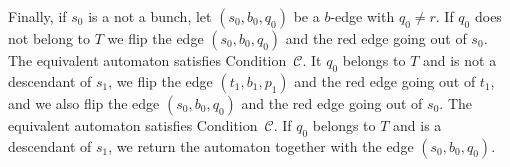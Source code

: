 \documentclass[11pt,a4paper]{article}
\def\C{\mathscr{C}}
\def\T{{T}}
\begin{document}
\begin{itemize}
\begin{itemize}
\begin{itemize}
\begin{itemize}
Finally, if $s_0$ is a not a bunch, let
  $(s_0,b_0,q_0)$ be a $b$-edge with $q_0 \neq r$.  If $q_0$ does not
  belong to $\T$ we flip the edge $(s_0,b_0,q_0)$ and the red edge
  going out of $s_0$.  The equivalent automaton satisfies
  Condition~$\C$. It $q_0$ belongs to $\T$ and is not a descendant of
  $s_1$, we flip the edge $(t_1,b_1,p_1)$ and the red edge going out
  of $t_1$, and we also flip the edge $(s_0,b_0,q_0)$ and the red edge
  going out of $s_0$.  The equivalent automaton satisfies
  Condition~$\C$.  If $q_0$ belongs to $\T$ and is a descendant of
  $s_1$, we return the automaton together with the edge
  $(s_0,b_0,q_0)$.
\end{itemize}
\end{itemize}
\end{itemize}





\end{itemize}
\end{document}
